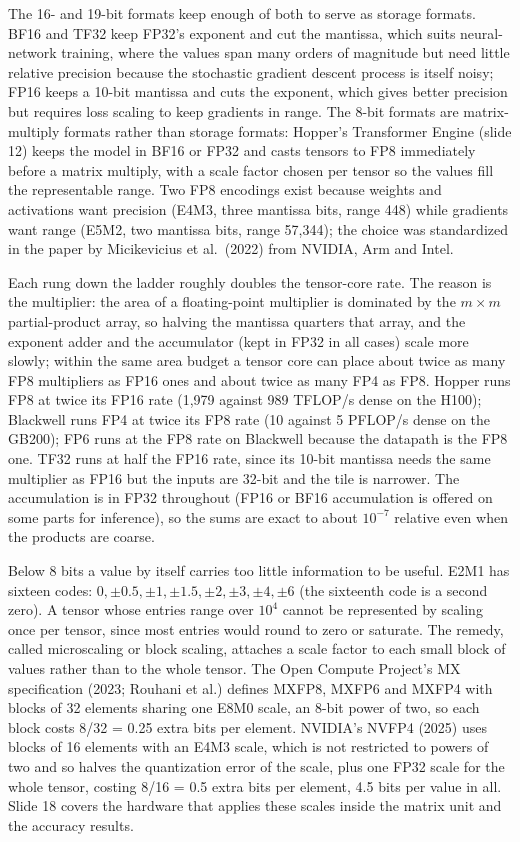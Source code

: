\documentclass[11pt,letterpaper]{article}
\begin{document}
The 16- and 19-bit formats keep enough of both to serve as storage formats. BF16 and TF32 keep FP32's exponent and cut the mantissa, which suits neural-network training, where the values span many orders of magnitude but need little relative precision because the stochastic gradient descent process is itself noisy; FP16 keeps a 10-bit mantissa and cuts the exponent, which gives better precision but requires loss scaling to keep gradients in range. The 8-bit formats are matrix-multiply formats rather than storage formats: Hopper's Transformer Engine (slide 12) keeps the model in BF16 or FP32 and casts tensors to FP8 immediately before a matrix multiply, with a scale factor chosen per tensor so the values fill the representable range. Two FP8 encodings exist because weights and activations want precision (E4M3, three mantissa bits, range 448) while gradients want range (E5M2, two mantissa bits, range 57,344); the choice was standardized in the paper by Micikevicius et al.\ (2022) from NVIDIA, Arm and Intel.

Each rung down the ladder roughly doubles the tensor-core rate. The reason is the multiplier: the area of a floating-point multiplier is dominated by the $m \times m$ partial-product array, so halving the mantissa quarters that array, and the exponent adder and the accumulator (kept in FP32 in all cases) scale more slowly; within the same area budget a tensor core can place about twice as many FP8 multipliers as FP16 ones and about twice as many FP4 as FP8. Hopper runs FP8 at twice its FP16 rate (1,979 against 989 TFLOP/s dense on the H100); Blackwell runs FP4 at twice its FP8 rate (10 against 5 PFLOP/s dense on the GB200); FP6 runs at the FP8 rate on Blackwell because the datapath is the FP8 one. TF32 runs at half the FP16 rate, since its 10-bit mantissa needs the same multiplier as FP16 but the inputs are 32-bit and the tile is narrower. The accumulation is in FP32 throughout (FP16 or BF16 accumulation is offered on some parts for inference), so the sums are exact to about $10^{-7}$ relative even when the products are coarse.

Below 8 bits a value by itself carries too little information to be useful. E2M1 has sixteen codes: $0, \pm 0.5, \pm 1, \pm 1.5, \pm 2, \pm 3, \pm 4, \pm 6$ (the sixteenth code is a second zero). A tensor whose entries range over $10^{4}$ cannot be represented by scaling once per tensor, since most entries would round to zero or saturate. The remedy, called microscaling or block scaling, attaches a scale factor to each small block of values rather than to the whole tensor. The Open Compute Project's MX specification (2023; Rouhani et al.) defines MXFP8, MXFP6 and MXFP4 with blocks of 32 elements sharing one E8M0 scale, an 8-bit power of two, so each block costs 8/32 = 0.25 extra bits per element. NVIDIA's NVFP4 (2025) uses blocks of 16 elements with an E4M3 scale, which is not restricted to powers of two and so halves the quantization error of the scale, plus one FP32 scale for the whole tensor, costing 8/16 = 0.5 extra bits per element, 4.5 bits per value in all. Slide 18 covers the hardware that applies these scales inside the matrix unit and the accuracy results.
\end{document}
